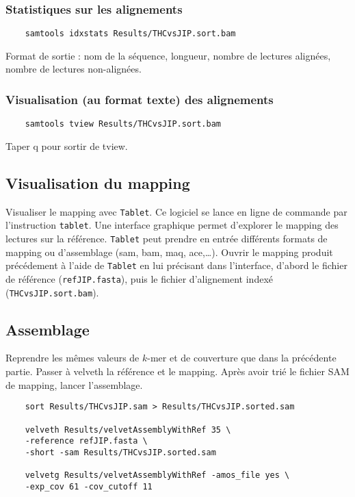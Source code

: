 \documentclass[a4paper,12pt]{article}
\begin{document}
\subsubsection*{Statistiques sur les alignements}
\begin{lstlisting}
	samtools idxstats Results/THCvsJIP.sort.bam
\end{lstlisting}
Format de sortie : nom de la séquence, longueur, nombre de lectures alignées, nombre de lectures non-alignées.

\subsubsection*{Visualisation (au format texte) des alignements}
\begin{lstlisting}
	samtools tview Results/THCvsJIP.sort.bam
\end{lstlisting}
Taper q pour sortir de tview.



\subsection{Visualisation du mapping}
Visualiser le mapping avec \verb=Tablet=. Ce logiciel se lance en ligne de commande par l'instruction \verb=tablet=. Une interface graphique permet d'explorer le mapping des lectures sur la référence. \verb=Tablet= peut prendre en entrée différents formats de mapping ou d'assemblage (sam, bam, maq, ace,\ldots). Ouvrir le mapping produit précédement à l'aide de \verb=Tablet= en lui précisant dans l'interface, d'abord le fichier de référence (\verb=refJIP.fasta=), puis le fichier d'alignement indexé (\verb=THCvsJIP.sort.bam=).

\subsection{Assemblage}
Reprendre les mêmes valeurs de $k$-mer et de couverture que dans la précédente partie. Passer à velveth la référence et le mapping. Après avoir trié le fichier SAM de mapping, lancer l'assemblage.

\begin{lstlisting}
	sort Results/THCvsJIP.sam > Results/THCvsJIP.sorted.sam

	velveth Results/velvetAssemblyWithRef 35 \
	-reference refJIP.fasta \
	-short -sam Results/THCvsJIP.sorted.sam
	
	velvetg Results/velvetAssemblyWithRef -amos_file yes \
	-exp_cov 61 -cov_cutoff 11
\end{lstlisting}
\end{document}

